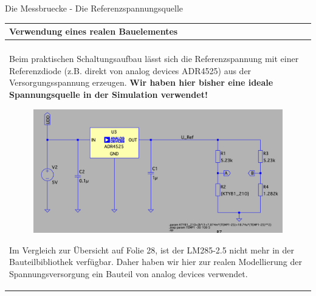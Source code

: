 \begin{frame}[t]{Die Messbruecke - Die Referenzspannungsquelle}

    \begin{spacing}{0.9} \begin{tiny}
            \begin{table}[h!]
                \begin{tabular}{p{10cm} }
                    \hline
                    \textbf{Verwendung eines realen Bauelementes} \\
                    \hline                                        \\
                    \begin{minipage}{\textwidth}
                        Beim praktischen Schaltungsaufbau lässt sich die Referenzspannung mit einer Referenzdiode (z.B. direkt von analog devices ADR4525)
                        aus der Versorgungsspannung erzeugen. \textbf{Wir haben hier bisher eine ideale Spannungsquelle in der Simulation verwendet!}\newline
                        \begin{figure}
                            \includegraphics[width=0.8\linewidth]{pictures/uref.png}
                        \end{figure}
                        Im Vergleich zur Übersicht auf Folie 28, ist der LM285-2.5 nicht mehr in der Bauteilbibliothek verfügbar.
                        Daher haben wir hier zur realen Modellierung der Spannungsversorgung ein Bauteil von analog devices verwendet.
                    \end{minipage}
                \end{tabular}

            \end{table}

        \end{tiny} \end{spacing}

\end{frame}

